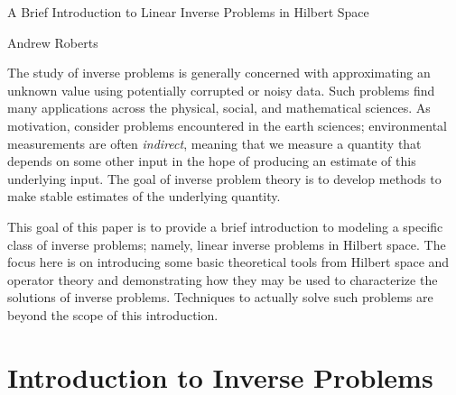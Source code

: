 \documentclass[12pt]{article}
\begin{document}
\begin{center}
\Large
A Brief Introduction to Linear Inverse Problems in Hilbert Space
\end{center}

\begin{flushright}
Andrew Roberts
\end{flushright} 

The study of inverse problems is generally concerned with approximating 
an unknown value using potentially corrupted or noisy data. Such problems find
many applications across the physical, social, and mathematical sciences. As motivation, consider
problems encountered in the earth sciences; environmental measurements are often \textit{indirect}, meaning that we measure a quantity
that depends on some other input in the hope of producing an estimate of this 
underlying input. The goal of inverse problem theory is to develop methods to make stable
estimates of the underlying quantity.

This goal of this paper is to provide a brief introduction to modeling a specific class of inverse
problems; namely, linear inverse problems in Hilbert space.
The focus here is on introducing some basic theoretical tools from Hilbert space and 
operator theory and demonstrating how they may be used to characterize the 
solutions of inverse problems. Techniques to actually solve such problems are beyond the
scope of this introduction. 

\section{Introduction to Inverse Problems} \label{inverse_problem_intro}
\end{document}
